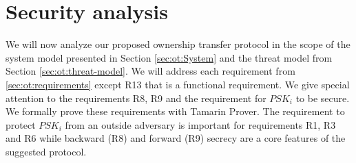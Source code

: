 {\section{Security analysis}
\label{sec:ot:analysis}
We will now analyze our proposed ownership transfer protocol in the scope of the system model presented in Section \ref{sec:ot:System} and the threat model from Section \ref{sec:ot:threat-model}. We will address each requirement from \ref{sec:ot:requirements} except R13 that is a functional requirement. We give special attention to the requirements R8, R9 and the requirement for $PSK_i$ to be secure. We formally prove these requirements with Tamarin Prover\cite{basin2017symbolically}. The requirement to protect $PSK_i$ from an outside adversary is important for requirements R1, R3 and R6 while backward (R8) and forward (R9) secrecy are a core features of the suggested protocol.



}
